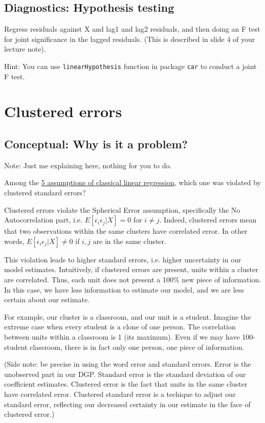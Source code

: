 \documentclass{article}\usepackage[]{graphicx}\usepackage[]{color}
\begin{document}
\subsection{Diagnostics: Hypothesis testing}

Regress residuals against X and lag1 and lag2 residuals, and then doing an F test for joint significance in the lagged residuals. (This is described in slide 4 of your lecture note).

Hint: You can use \verb`linearHypothesis` function in package \verb`car` to conduct a joint F test.

\section{Clustered errors}

\subsection{Conceptual: Why is it a problem?}

Note: Just me explaining here, nothing for you to do.

Among the \href{https://en.wikipedia.org/wiki/Ordinary_least_squares#Assumptions}{5 assumptions of classical linear regression}, which one was violated by clustered standard errors?

Clustered errors violate the Spherical Error assumption, specifically the No Autocorrelation part, i.e. $E[\epsilon_i\epsilon_j|X] = 0$ for $i \neq j$. Indeed, clustered errors mean that two observations within the same clusters have correlated error. In other words, $E[\epsilon_i\epsilon_j|X] \neq 0$ if $i, j$ are in the same cluster.

This violation leads to higher standard errors, i.e. higher uncertainty in our model estimates. Intuitively, if clustered errors are present, units within a cluster are correlated. Thus, each unit does not present a 100\% new piece of information. In this case, we have less information to estimate our model, and we are less certain about our estimate.

For example, our cluster is a classroom, and our unit is a student. Imagine the extreme case when every student is a clone of one person. The correlation between units within a classroom is 1 (its maximum). Even if we may have 100-student classroom, there is in fact only one person, one piece of information.

(Side note: be precise in using the word error and standard errors. Error is the unobserved part in our DGP. Standard error is the standard deviation of our coefficient estimates. Clustered error is the fact that units in the same cluster have correlated error. Clustered standard error is a techique to adjust our standard error, reflecting our decreased certainty in our estimate in the face of clustered error.)
\end{document}
